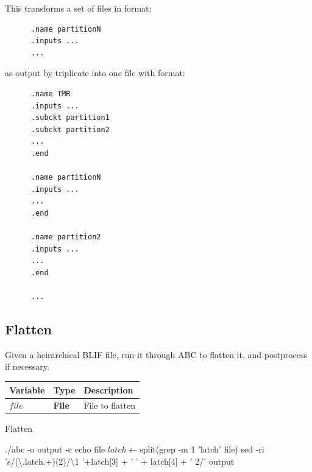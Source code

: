 \documentclass[12pt,final,oneside]{dwThesis} %
\begin{document}
   This transforms a set of files in format: 
   \begin{lstlisting}
      .name partitionN
      .inputs ...
      ...
   \end{lstlisting}

   as output by triplicate
   into one file with format: 
   \begin{lstlisting}
      .name TMR
      .inputs ... 
      .subckt partition1 
      .subckt partition2 
      ...  
      .end

      .name partitionN
      .inputs ...
      ...
      .end
      
      .name partition2 
      .inputs ...
      ...  
      .end 
      
      ...

   \end{lstlisting}
   \newpage 
   \subsection{Flatten}
   \label{algFlatten} Given a
   heirarchical \gls{BLIF} file, run it through
   \gls{ABC} to flatten it, and postprocess if
   necessary.  
   \begin{algorithm}

      \begin{center}


         \begin{tabularx}
            {\linewidth}{llX} \toprule Variable & Type &
            Description\\
            \midrule $file$ &\textbf{  File } &  File to
            flatten\\
            \bottomrule 
         \end{tabularx}

      \end{center}

      \caption{Flatten}\label{Flatten} 
      \begin{algorithmic}
         [1]
           
         \State ./abc -o output -c
         echo file  
         \State $latch \gets $split(grep -m 1 '\.latch' file)
         \State sed -ri
         's/(\textbackslash.latch.+)(2)/\textbackslash1 '+latch[3] + ' ' +
         latch[4] + ' 2/' output \EndIf \EndProcedure 
      \end{algorithmic}


   \end{algorithm}
\end{document}
